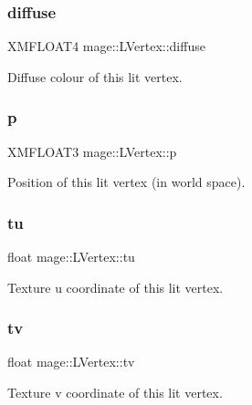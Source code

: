 \subsubsection{\texorpdfstring{diffuse}{diffuse}}
{\footnotesize\ttfamily X\+M\+F\+L\+O\+A\+T4 mage\+::\+L\+Vertex\+::diffuse}

Diffuse colour of this lit vertex. \hypertarget{structmage_1_1_l_vertex_afdf01d172b1992d4e4f37b9ad9fb2d27}{}\label{structmage_1_1_l_vertex_afdf01d172b1992d4e4f37b9ad9fb2d27} 
\subsubsection{\texorpdfstring{p}{p}}
{\footnotesize\ttfamily X\+M\+F\+L\+O\+A\+T3 mage\+::\+L\+Vertex\+::p}

Position of this lit vertex (in world space). \hypertarget{structmage_1_1_l_vertex_a820b1dba91a65e4be9a41c4297970dd6}{}\label{structmage_1_1_l_vertex_a820b1dba91a65e4be9a41c4297970dd6} 
\subsubsection{\texorpdfstring{tu}{tu}}
{\footnotesize\ttfamily float mage\+::\+L\+Vertex\+::tu}

Texture u coordinate of this lit vertex. \hypertarget{structmage_1_1_l_vertex_ab5e712d5befd3b8e3b58c772e6d3bf50}{}\label{structmage_1_1_l_vertex_ab5e712d5befd3b8e3b58c772e6d3bf50} 
\subsubsection{\texorpdfstring{tv}{tv}}
{\footnotesize\ttfamily float mage\+::\+L\+Vertex\+::tv}

Texture v coordinate of this lit vertex. 